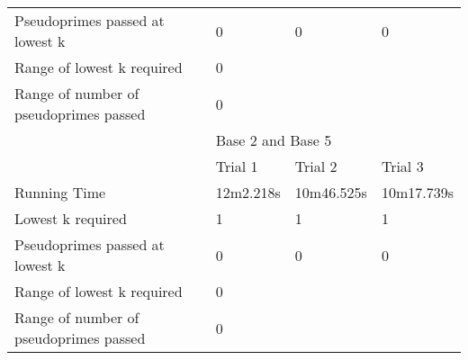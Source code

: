 \documentclass{article}
\begin{document}
\begin{appendices}
\begin{table}[h]
\begin{tabular}{@{}llll@{}}
Pseudoprimes passed at lowest k        & 0           & 0          & 0          \\\cmidrule(lr){2-4}
Range of lowest k required             & \multicolumn{3}{l}{0}                 \\
Range of number of pseudoprimes passed & \multicolumn{3}{l}{0}                 \\\midrule
                                       & \multicolumn{3}{l}{Base 2 and Base 5} \\\midrule
                                       & Trial 1     & Trial 2    & Trial 3    \\
Running Time                           & 12m2.218s   & 10m46.525s & 10m17.739s \\
Lowest k required                      & 1           & 1          & 1          \\
Pseudoprimes passed at lowest k        & 0           & 0          & 0          \\\cmidrule(lr){2-4}
Range of lowest k required             & \multicolumn{3}{l}{0}                 \\
Range of number of pseudoprimes passed & \multicolumn{3}{l}{0}                 \\ \bottomrule
\end{tabular}
\end{table}
\FloatBarrier

\end{appendices}
\end{document}
